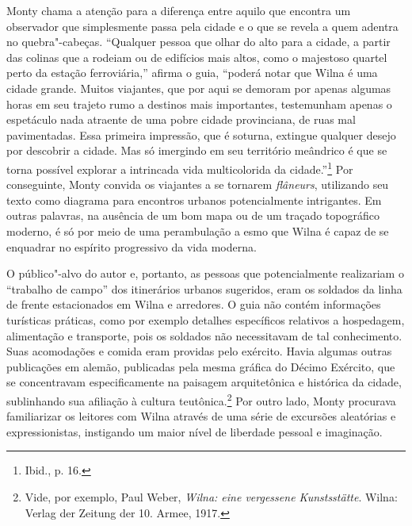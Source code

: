 Monty chama a atenção para a diferença entre aquilo que encontra um
observador que simplesmente passa pela cidade e o que se revela a quem
adentra no quebra"-cabeças. ``Qualquer pessoa que olhar do alto para a
cidade, a partir das colinas que a rodeiam ou de edifícios mais altos,
como o majestoso quartel perto da estação ferroviária,'' afirma o guia,
``poderá notar que Wilna é uma cidade grande. Muitos viajantes, que por
aqui se demoram por apenas algumas horas em seu trajeto rumo a destinos
mais importantes, testemunham apenas o espetáculo nada atraente de uma
pobre cidade provinciana, de ruas mal pavimentadas. Essa primeira
impressão, que é soturna, extingue qualquer desejo por descobrir a
cidade. Mas só imergindo em seu território meândrico é que se torna
possível explorar a intrincada vida multicolorida da cidade.''\footnote{Ibid.,
  p. 16.} Por conseguinte, Monty convida os viajantes a se tornarem
\emph{flâneurs}, utilizando seu texto como diagrama para encontros
urbanos potencialmente intrigantes. Em outras palavras, na ausência de
um bom mapa ou de um traçado topográfico moderno, é só por meio de uma
perambulação a esmo que Wilna é capaz de se enquadrar no espírito
progressivo da vida moderna.

O público"-alvo do autor e, portanto, as pessoas que potencialmente
realizariam o ``trabalho de campo'' dos itinerários urbanos sugeridos,
eram os soldados da linha de frente estacionados em Wilna e arredores. O
guia não contém informações turísticas práticas, como por exemplo
detalhes específicos relativos a hospedagem, alimentação e transporte,
pois os soldados não necessitavam de tal conhecimento. Suas acomodações
e comida eram providas pelo exército. Havia algumas outras publicações
em alemão, publicadas pela mesma gráfica do Décimo Exército, que se
concentravam especificamente na paisagem arquitetônica e histórica da
cidade, sublinhando sua afiliação à cultura teutônica.\footnote{Vide,
  por exemplo, Paul Weber, \emph{Wilna: eine vergessene Kunstsstätte}.
  Wilna: Verlag der Zeitung der 10. Armee, 1917.} Por outro lado, Monty
procurava familiarizar os leitores com Wilna através de uma série de
excursões aleatórias e expressionistas, instigando um maior nível de
liberdade pessoal e imaginação.

%

